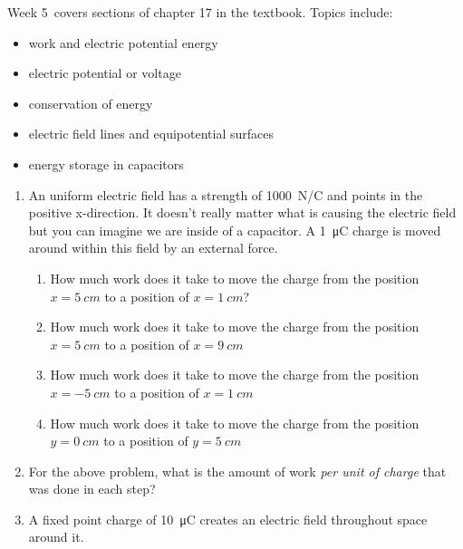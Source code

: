 \renewcommand{\week}{Week 5}

\week \ covers sections of chapter 17 in the textbook. Topics include:

\begin{itemize}
	\item work and electric potential energy
	\item electric potential or voltage
    \item conservation of energy
    \item electric field lines and equipotential surfaces
	\item energy storage in capacitors
\end{itemize}

\begin{enumerate}
\setlength\itemsep{2 in}
	
\item An uniform electric field has a strength of \SI{1000}{N/C} and points in the positive x-direction. It doesn't really matter what is causing the electric field but you can imagine we are inside of a capacitor. A \SI{1}{\micro\coulomb} charge is moved around within this field by an external force. 
\begin{enumerate}
\setlength\itemsep{1 in}
	\item How much work does it take to move the charge from the position $x=\SI{5}{cm}$ to a position of $x=\SI{1}{cm}$?
	\item How much work does it take to move the charge from the position $x=\SI{5}{cm}$ to a position of $x=\SI{9}{cm}$ 
	\item How much work does it take to move the charge from the position $x=\SI{-5}{cm}$ to a position of $x=\SI{1}{cm}$
	\item How much work does it take to move the charge from the position $y=\SI{0}{cm}$ to a position of $y=\SI{5}{cm}$
\end{enumerate}

\item 
For the above problem, what is the amount of work \emph{per unit of charge} that was done in each step?\bigskip

\item
A fixed point charge of \SI{10}{\micro\coulomb} creates an electric field throughout space around it. 
\begin{enumerate}
   \setlength\itemsep{1 in}


\end{enumerate}
\end{enumerate}
